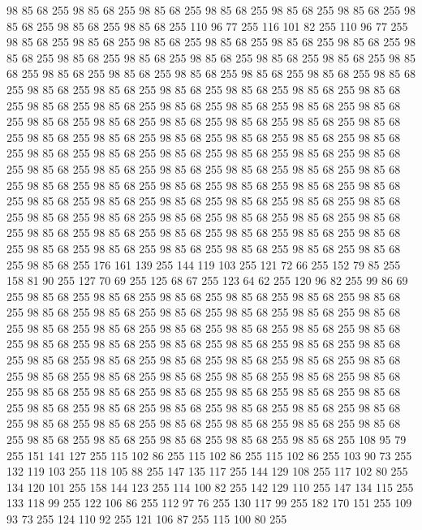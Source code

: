 98 85 68 255 98 85 68 255 98 85 68 255 98 85 68 255 98 85 68 255 98 85 68 255 98 85 68 255 98 85 68 255 98 85 68 255 110 96 77 255 116 101 82 255 110 96 77 255 98 85 68 255 98 85 68 255 98 85 68 255 98 85 68 255 98 85 68 255 98 85 68 255 98 85 68 255 98 85 68 255 98 85 68 255 98 85 68 255 98 85 68 255 98 85 68 255 98 85 68 255 98 85 68 255 98 85 68 255 98 85 68 255 98 85 68 255 98 85 68 255 98 85 68 255 98 85 68 255 98 85 68 255 98 85 68 255 98 85 68 255 98 85 68 255 98 85 68 255 98 85 68 255 98 85 68 255 98 85 68 255 98 85 68 255 98 85 68 255 98 85 68 255 98 85 68 255 98 85 68 255 98 85 68 255 98 85 68 255 98 85 68 255 98 85 68 255 98 85 68 255 98 85 68 255 98 85 68 255 98 85 68 255 98 85 68 255 98 85 68 255 98 85 68 255 98 85 68 255 98 85 68 255 98 85 68 255 98 85 68 255 98 85 68 255 98 85 68 255 98 85 68 255 98 85 68 255
98 85 68 255 98 85 68 255 98 85 68 255 98 85 68 255 98 85 68 255 98 85 68 255 98 85 68 255 98 85 68 255 98 85 68 255 98 85 68 255 98 85 68 255 98 85 68 255 98 85 68 255 98 85 68 255 98 85 68 255 98 85 68 255 98 85 68 255 98 85 68 255 98 85 68 255 98 85 68 255 98 85 68 255 98 85 68 255 98 85 68 255 98 85 68 255 98 85 68 255 98 85 68 255 98 85 68 255 98 85 68 255 98 85 68 255 98 85 68 255 98 85 68 255 98 85 68 255 98 85 68 255 98 85 68 255 176 161 139 255 144 119 103 255 121 72 66 255 152 79 85 255 158 81 90 255 127 70 69 255 125 68 67 255 123 64 62 255 120 96 82 255 99 86 69 255 98 85 68 255 98 85 68 255 98 85 68 255 98 85 68 255 98 85 68 255 98 85 68 255 98 85 68 255 98 85 68 255 98 85 68 255 98 85 68 255 98 85 68 255 98 85 68 255 98 85 68 255 98 85 68 255 98 85 68 255 98 85 68 255 98 85 68 255 98 85 68 255 98 85 68 255 98 85 68 255
98 85 68 255 98 85 68 255 98 85 68 255 98 85 68 255 98 85 68 255 98 85 68 255 98 85 68 255 98 85 68 255 98 85 68 255 98 85 68 255 98 85 68 255 98 85 68 255 98 85 68 255 98 85 68 255 98 85 68 255 98 85 68 255 98 85 68 255 98 85 68 255 98 85 68 255 98 85 68 255 98 85 68 255 98 85 68 255 98 85 68 255 98 85 68 255 98 85 68 255 98 85 68 255 98 85 68 255 98 85 68 255 98 85 68 255 98 85 68 255 98 85 68 255 98 85 68 255 98 85 68 255 98 85 68 255 98 85 68 255 98 85 68 255 98 85 68 255 98 85 68 255 98 85 68 255 108 95 79 255 151 141 127 255 115 102 86 255 115 102 86 255 115 102 86 255 103 90 73 255 132 119 103 255 118 105 88 255 147 135 117 255 144 129 108 255 117 102 80 255 134 120 101 255 158 144 123 255 114 100 82 255 142 129 110 255 147 134 115 255 133 118 99 255 122 106 86 255 112 97 76 255 130 117 99 255 182 170 151 255 109 93 73 255 124 110 92 255 121 106 87 255 115 100 80 255

